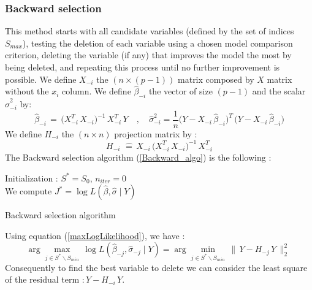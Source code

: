\newpage
\subsubsection{Backward selection}
This method starts with all candidate variables
(defined by the set of indices $S_{max}$), testing the deletion of each variable using a chosen model comparison criterion,
 deleting the variable (if any) that improves the model the most by being deleted, and repeating this process until no further improvement is possible.
We define $X_{-i}$ the $(n \times (p-1))$ matrix composed by $X$ matrix without the $x_i$ column.
We define $\hat{\beta}_{-i}$ the vector of size $(p-1)$ and the scalar $\hat{\sigma}_{-i}^2$ by:
 \begin{equation}
  \hat{\beta}_{-i} \,=\, \big(X^T_{-i} \,X_{-i}\big)^{-1} \,X^T_{-i} \, Y
\quad,\quad
\hat{\sigma}_{-i}^2 = \frac{1}{n}\big(Y-X_{-i} \,\hat{\beta}_{-i}\big)^T\,\big(Y-X_{-i} \,\hat{\beta}_{-i}\big)
\end{equation}
We define $H_{-i}$ the $(n\times n)$ projection matrix by :
 \begin{equation}
\label{H-}
H_{-i}\, \,\hat{=}\, X_{-i}\,\big(X^T_{-i} \,X_{-i}\big)^{-1} \,X^T_{-i}
 \end{equation}
The Backward selection algorithm (\ref{Backward_algo}) is the following :
\begin{algorithm}
\label{Backward_algo}
Initialization : $S^* = S_0$, $n_{iter} = 0 $\\
We compute $J^* = \log L(\hat{\beta},\hat{\sigma}\mid Y)$  \\
\caption{Backward selection algorithm }
\end{algorithm}

Using equation (\ref{maxLogLikelihood}), we have :
 \begin{equation}
 \arg   \displaystyle\max_{j \in S^*\backslash S_{min}}\,  \log L(\hat{\beta}_{-j},\hat{\sigma}_{-j}\mid Y) =
\arg \displaystyle\min_{j \in S^*\backslash S_{min}}\, \|\,Y-H_{-j}\,Y\,\|^2_2  \,\,
 \end{equation}
 Consequently to find the best variable to delete we can consider the least square of the residual term $:Y-H_{-i}\,Y$.

